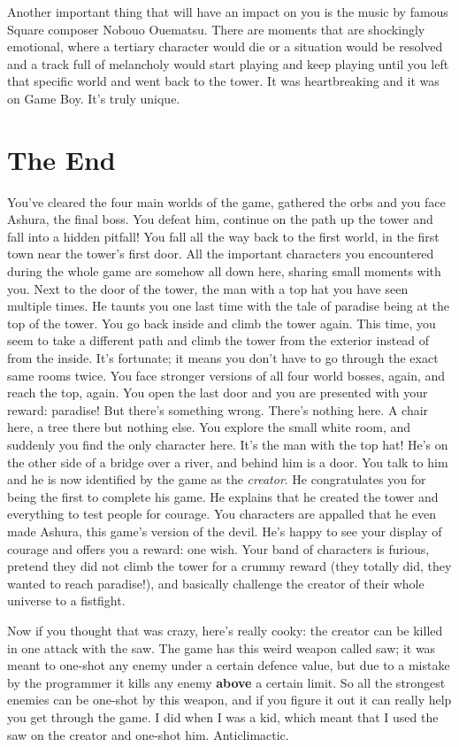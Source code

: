 \documentclass{book}
\begin{document}
Another important thing that will have an impact on you is the music by famous Square composer Nobouo Ouematsu. There are moments that are shockingly emotional, where a tertiary character would die or a situation would be resolved and a track full of melancholy would start playing and keep playing until you left that specific world and went back to the tower. It was heartbreaking and it was on Game Boy. It’s truly unique.\par
\FloatBarrier\section*{The End}
You’ve cleared the four main worlds of the game, gathered the orbs and you face Ashura, the final boss. You defeat him, continue on the path up the tower and fall into a hidden pitfall! You fall all the way back to the first world, in the first town near the tower’s first door. All the important characters you encountered during the whole game are somehow all down here, sharing small moments with you. Next to the door of the tower, the man with a top hat you have seen multiple times. He taunts you one last time with the tale of paradise being at the top of the tower. You go back inside and climb the tower again. This time, you seem to take a different path and climb the tower from the exterior instead of from the inside. It’s fortunate; it means you don’t have to go through the exact same rooms twice. You face stronger versions of all four world bosses, again, and reach the top, again. You open the last door and you are presented with your reward: paradise! But there’s something wrong. There’s nothing here. A chair here, a tree there but nothing else. You explore the small white room, and suddenly you find the only character here. It’s the man with the top hat! He’s on the other side of a bridge over a river, and behind him is a door. You talk to him and he is now identified by the game as the \emph{creator}. He congratulates you for being the first to complete his game. He explains that he created the tower and everything to test people for courage. You characters are appalled that he even made Ashura, this game’s version of the devil. He’s happy to see your display of courage and offers you a reward: one wish. Your band of characters is furious, pretend they did not climb the tower for a crummy reward (they totally did, they wanted to reach paradise!), and basically challenge the creator of their whole universe to a fistfight.\par
Now if you thought that was crazy, here’s really cooky: the creator can be killed in one attack with the saw. The game has this weird weapon called saw; it was meant to one-shot any enemy under a certain defence value, but due to a mistake by the programmer it kills any enemy \textbf{above} a certain limit. So all the strongest enemies can be one-shot by this weapon, and if you figure it out it can really help you get through the game. I did when I was a kid, which meant that I used the saw on the creator and one-shot him. Anticlimactic.\par
\end{document}
